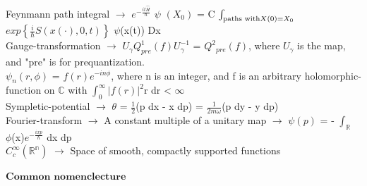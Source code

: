 \documentclass[10pt,fancy]{elegantbook}
\begin{document}
\begin{note}
Feynmann path integral $\longrightarrow$ $e^{- \frac{i t \hat {H}}{\hbar}}$ $\psi$ $(X_0)$ = C $\int_{\text{paths with} \\ X(0)=X_0}$ $exp\left\{ \frac{i}{\hbar}S(x(\cdot),0,t) \right\}$ $\psi$(x(t)) Dx \\

 
Gauge-transformation $\longrightarrow$ $U_\gamma Q^{1}_{pre}(f)U^{-1}_{\gamma}$ = $Q^{2}{_{pre}}(f)$, where $U_\gamma$ is the map, and "pre" is for prequantization.  \\

$\psi_n(r,\phi)$ = $f(r) e^{-i n\phi}$, where n is an integer, and f is an arbitrary holomorphic-function on $\mathbb C$ with
$\int_0^{\infty}|f(r)|^2$r dr < $\infty$ \\
 
Sympletic-potential $\longrightarrow$ $\theta$ = $\frac{1}{2}$(p dx - x dp) = $\frac{1}{{2m} \omega}$(p dy - y dp)  \\
  
Fourier-transform $\longrightarrow$ A constant multiple of a unitary map $\longrightarrow$ $\psi(p)$ = - $\int_\mathbb R$ $\phi$(x)$e^{- \frac{{ixp}}{\hbar}}$ dx dp  \\
  
$C_c^{\infty}(\mathbb {R^n})$ $\longrightarrow$ Space of smooth, compactly supported functions                                           
\end{note}
 
$\mathbf{\textbf{Common nomenclecture}}$ 
\end{document}
